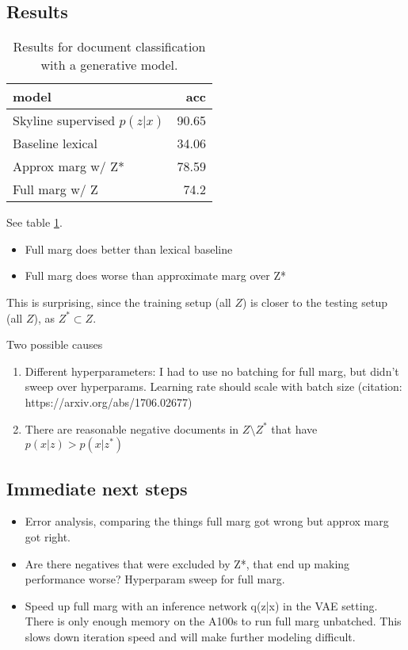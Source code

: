 \documentclass[11pt]{article}
\begin{document}
\subsection{Results}

\begin{table}
\centering
\begin{tabular}{lr}
\toprule
model & acc\\
\midrule
Skyline supervised $p(z|x)$ & 90.65\\
Baseline lexical & 34.06\\
Approx marg w/ Z* & 78.59\\
Full marg w/ Z & 74.2\\
\bottomrule
\end{tabular}
\caption{
\label{tbl:unsup-doc-app}
Results for document classification with a generative model.}
\end{table}

See table \ref{tbl:unsup-doc-app}.

\begin{itemize}
\item Full marg does better than lexical baseline
\item Full marg does worse than approximate marg over Z*
\end{itemize}
This is surprising, since the training setup (all $Z$) is closer to the testing setup (all $Z$),
as $Z^*\subset Z$.

Two possible causes
\begin{enumerate}
\item Different hyperparameters: I had to use no batching for full marg, but didn’t sweep over hyperparams. Learning rate should scale with batch size (citation: https://arxiv.org/abs/1706.02677)
\item There are reasonable negative documents in $Z \setminus Z^*$ that have $p(x|z) > p(x|z^*)$
\end{enumerate}

\subsection{Immediate next steps}
\begin{itemize}
\item Error analysis, comparing the things full marg got wrong but approx marg got right.
\item Are there negatives that were excluded by Z*, that end up making performance worse?
Hyperparam sweep for full marg.
\item Speed up full marg with an inference network q(z|x) in the VAE setting.
There is only enough memory on the A100s to run full marg unbatched. This slows down iteration speed and will make further modeling difficult.
\end{itemize}
\end{document}
